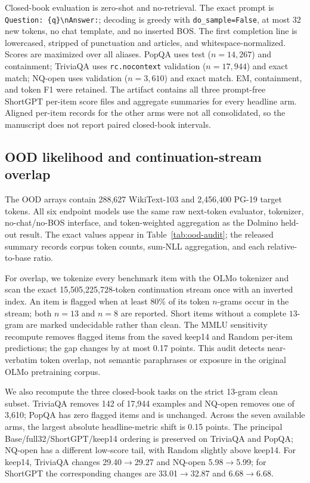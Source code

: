 Closed-book evaluation is zero-shot and no-retrieval. The exact prompt is
\texttt{Question: \{q\}\textbackslash nAnswer:}; decoding is greedy with
\texttt{do\_sample=False}, at most 32 new tokens, no chat template, and no
inserted BOS. The first completion line is lowercased, stripped of punctuation
and articles, and whitespace-normalized. Scores are maximized over all aliases.
PopQA uses test ($n{=}14{,}267$) and containment; TriviaQA uses
\texttt{rc.nocontext} validation ($n{=}17{,}944$) and exact match; NQ-open uses
validation ($n{=}3{,}610$) and exact match. EM, containment, and token F1 were
retained. The artifact contains all three prompt-free ShortGPT per-item score
files and aggregate summaries for every headline arm. Aligned per-item records
for the other arms were not all consolidated, so the manuscript does not report
paired closed-book intervals.

\subsection{OOD likelihood and continuation-stream overlap}
\label{app:ood-contamination}
The OOD arrays contain 288,627 WikiText-103 and 2,456,400 PG-19 target
tokens. All six endpoint models use the same raw next-token evaluator,
tokenizer, no-chat/no-BOS interface, and token-weighted aggregation as the
Dolmino held-out result. The exact values appear in
Table~\ref{tab:ood-audit}; the released summary records corpus token counts,
sum-NLL aggregation, and each relative-to-base ratio.

For overlap, we tokenize every benchmark item with the OLMo tokenizer and scan
the exact 15,505,225,728-token continuation stream once with an inverted
index. An item is flagged when at least 80\% of its token $n$-grams occur in
the stream; both $n=13$ and $n=8$ are reported. Short items without a complete
$13$-gram are marked undecidable rather than clean. The MMLU sensitivity
recompute removes flagged items from the saved keep14 and Random per-item
predictions; the gap changes by at most 0.17 points. This audit detects
near-verbatim token overlap, not semantic paraphrases or exposure in the
original OLMo pretraining corpus.

We also recompute the three closed-book tasks on the strict 13-gram clean
subset. TriviaQA removes 142 of 17,944 examples and NQ-open removes one of
3,610; PopQA has zero flagged items and is unchanged. Across the seven available
arms, the largest absolute headline-metric shift is 0.15 points. The principal
Base/full32/ShortGPT/keep14 ordering is preserved on TriviaQA and PopQA; NQ-open
has a different low-score tail, with Random slightly above keep14.
For keep14, TriviaQA changes 29.40$\rightarrow$29.27 and NQ-open
5.98$\rightarrow$5.99; for ShortGPT the corresponding changes are
33.01$\rightarrow$32.87 and 6.68$\rightarrow$6.68.


